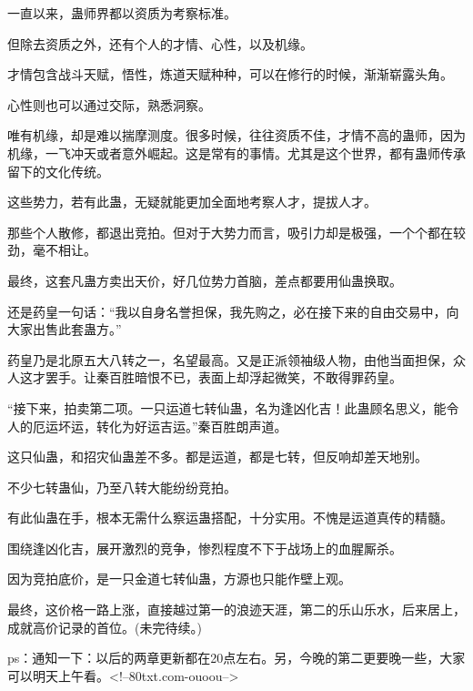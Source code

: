 \begin{this_body}
一直以来，蛊师界都以资质为考察标准。

但除去资质之外，还有个人的才情、心性，以及机缘。

才情包含战斗天赋，悟性，炼道天赋种种，可以在修行的时候，渐渐崭露头角。

心性则也可以通过交际，熟悉洞察。

唯有机缘，却是难以揣摩测度。很多时候，往往资质不佳，才情不高的蛊师，因为机缘，一飞冲天或者意外崛起。这是常有的事情。尤其是这个世界，都有蛊师传承留下的文化传统。

这些势力，若有此蛊，无疑就能更加全面地考察人才，提拔人才。

那些个人散修，都退出竞拍。但对于大势力而言，吸引力却是极强，一个个都在较劲，毫不相让。

最终，这套凡蛊方卖出天价，好几位势力首脑，差点都要用仙蛊换取。

还是药皇一句话：“我以自身名誉担保，我先购之，必在接下来的自由交易中，向大家出售此套蛊方。”

药皇乃是北原五大八转之一，名望最高。又是正派领袖级人物，由他当面担保，众人这才罢手。让秦百胜暗恨不已，表面上却浮起微笑，不敢得罪药皇。

“接下来，拍卖第二项。一只运道七转仙蛊，名为逢凶化吉！此蛊顾名思义，能令人的厄运坏运，转化为好运吉运。”秦百胜朗声道。

这只仙蛊，和招灾仙蛊差不多。都是运道，都是七转，但反响却差天地别。

不少七转蛊仙，乃至八转大能纷纷竞拍。

有此仙蛊在手，根本无需什么察运蛊搭配，十分实用。不愧是运道真传的精髓。

围绕逢凶化吉，展开激烈的竞争，惨烈程度不下于战场上的血腥厮杀。

因为竞拍底价，是一只金道七转仙蛊，方源也只能作壁上观。

最终，这价格一路上涨，直接越过第一的浪迹天涯，第二的乐山乐水，后来居上，成就高价记录的首位。(未完待续。)

ps：通知一下：以后的两章更新都在20点左右。另，今晚的第二更要晚一些，大家可以明天上午看。<!--80txt.com-ouoou-->

\end{this_body}

